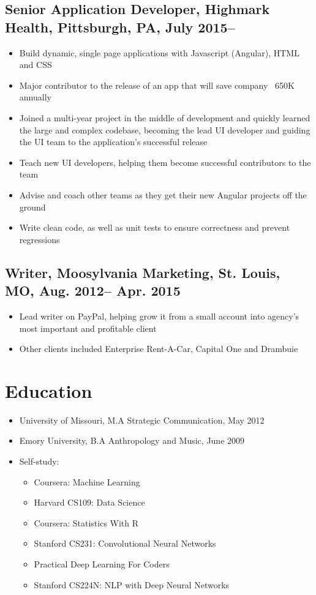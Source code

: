 \documentclass[10pt]{article}
\begin{document}
		\subsection{\normalsize{Senior Application Developer, Highmark Health, Pittsburgh, PA, July 2015--}}
		\begin{itemize}[noitemsep]
		\item Build dynamic, single page applications with Javascript (Angular), HTML and CSS
		\item Major contributor to the release of an app that will save company ~650K annually
		\item Joined a multi-year project in the middle of development and quickly learned the large and complex codebase, becoming the lead UI developer and guiding the UI team to the application's successful release
		\item Teach new UI developers, helping them become successful contributors to the team
		\item Advise and coach other teams as they get their new Angular projects off the ground
		\item Write clean code, as well as unit tests to ensure correctness and prevent regressions
		\end{itemize}
		
	\subsection{\normalsize{Writer, Moosylvania Marketing, St. Louis, MO, Aug. 2012-- Apr. 2015}}
	\begin{itemize}[noitemsep]
		\item Lead writer on PayPal, helping grow it from a small account into agency’s most important and profitable client
		\item Other clients included Enterprise Rent-A-Car, Capital One and Drambuie
	\end{itemize}
	
	\section{Education}
		\begin{itemize}[noitemsep]
			\item University of Missouri, M.A Strategic Communication, May 2012
			\item Emory University, B.A Anthropology and Music, June 2009
			\item Self-study:
				\begin{itemize}[noitemsep]
						\item Coursera: Machine Learning 
						\item Harvard CS109: Data Science
						\item Coursera: Statistics With R 
						\item Stanford CS231: Convolutional Neural Networks
						\item Practical Deep Learning For Coders 
						\item Stanford CS224N: NLP with Deep Neural Networks
				\end{itemize}
					
				
		\end{itemize}
	
\end{document}
